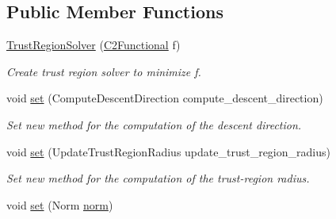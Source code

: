 \subsection*{\-Public \-Member \-Functions}
\begin{DoxyCompactItemize}
\item 
\hyperlink{classSpacy_1_1Algorithm_1_1TrustRegionSolver_a0e43b97119b6dc0a25fc9f242b084d16}{\-Trust\-Region\-Solver} (\hyperlink{classSpacy_1_1C2Functional}{\-C2\-Functional} f)
\begin{DoxyCompactList}\small\item\em \-Create trust region solver to minimize f. \end{DoxyCompactList}\item 
\hypertarget{classSpacy_1_1Algorithm_1_1TrustRegionSolver_aa36019ca1c80a230a1c45022d3cdfd9f}{void \hyperlink{classSpacy_1_1Algorithm_1_1TrustRegionSolver_aa36019ca1c80a230a1c45022d3cdfd9f}{set} (\-Compute\-Descent\-Direction compute\-\_\-descent\-\_\-direction)}\label{classSpacy_1_1Algorithm_1_1TrustRegionSolver_aa36019ca1c80a230a1c45022d3cdfd9f}

\begin{DoxyCompactList}\small\item\em \-Set new method for the computation of the descent direction. \end{DoxyCompactList}\item 
\hypertarget{classSpacy_1_1Algorithm_1_1TrustRegionSolver_a9f276e949d1dbfc6f40574be638e1fff}{void \hyperlink{classSpacy_1_1Algorithm_1_1TrustRegionSolver_a9f276e949d1dbfc6f40574be638e1fff}{set} (\-Update\-Trust\-Region\-Radius update\-\_\-trust\-\_\-region\-\_\-radius)}\label{classSpacy_1_1Algorithm_1_1TrustRegionSolver_a9f276e949d1dbfc6f40574be638e1fff}

\begin{DoxyCompactList}\small\item\em \-Set new method for the computation of the trust-\/region radius. \end{DoxyCompactList}\item 
\hypertarget{classSpacy_1_1Algorithm_1_1TrustRegionSolver_a680c40b650a60c9e9935e0c6b0e65888}{void \hyperlink{classSpacy_1_1Algorithm_1_1TrustRegionSolver_a680c40b650a60c9e9935e0c6b0e65888}{set} (\-Norm \hyperlink{namespaceSpacy_a86a4fc266aa19a07b0af16388907354b}{norm})}\label{classSpacy_1_1Algorithm_1_1TrustRegionSolver_a680c40b650a60c9e9935e0c6b0e65888}


\end{DoxyCompactItemize}
